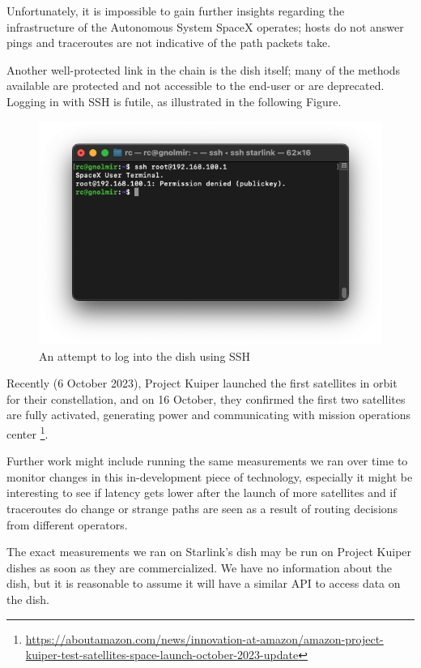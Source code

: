 \documentclass[IN,11pt,twoside,openright,idp,english]{tumthesis}
\begin{document}
Unfortunately, it is impossible to gain further insights regarding the infrastructure of the Autonomous System SpaceX operates; hosts do not answer pings and traceroutes are not indicative of the path packets take. 

Another well-protected link in the chain is the dish itself; many of the methods available are protected and not accessible to the end-user or are deprecated.
Logging in with SSH is futile, as illustrated in the following Figure.

\begin{figure}
    \centering
    \includegraphics[width=1\columnwidth]{img/ssh.png}
    \caption{An attempt to log into the dish using SSH}
    \label{fig:ssh}
\end{figure}

Recently (6 October  2023), Project Kuiper launched the first satellites in orbit for their constellation, and on 16 October, they confirmed the first two satellites are fully activated, generating power and communicating with mission operations center \footnote{\url{https://aboutamazon.com/news/innovation-at-amazon/amazon-project-kuiper-test-satellites-space-launch-october-2023-update}}.

Further work might include running the same measurements we ran over time to monitor changes in this in-development piece of technology, especially it might be interesting to see if latency gets lower after the launch of more satellites and if traceroutes do change or strange paths are seen as a result of routing decisions from different operators.

The exact measurements we ran on Starlink's dish may be run on Project Kuiper dishes as soon as they are commercialized. We have no information about the dish, but it is reasonable to assume it will have a similar API to access data on the dish.
\end{document}
